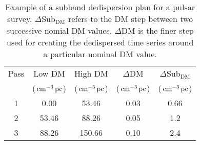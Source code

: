 \begin{table}[h]
    \def\arraystretch{1.25}
    \caption[Example of a subband dedispersion plan]{Example of a subband dedispersion plan for a pulsar survey. $\Delta$Sub$_{\text{DM}}$ refers to the DM step between two successive nomial DM values, $\Delta$DM is the finer step used for creating the dedispersed time series around a particular nominal DM value.}
    \centering
    \begin{tabular}{ccccc}
        \hline
        Pass & Low DM & High DM & $\Delta$DM & $\Delta$Sub$_{\text{DM}}$ \\
        & ($\,\text{cm}^{-3}\,\text{pc}$) & ($\,\text{cm}^{-3}\,\text{pc}$) & ($\,\text{cm}^{-3}\,\text{pc}$) & ($\,\text{cm}^{-3}\,\text{pc}$) \\
        \hline
        1 & 0.00 & 53.46 & 0.03 & 0.66 \\
        2 & 53.46 & 88.26 & 0.05 & 1.2 \\
        3 & 88.26 & 150.66 & 0.10 & 2.4 \\
        \hline
    \end{tabular}
    \label{tab:subband}
\end{table}